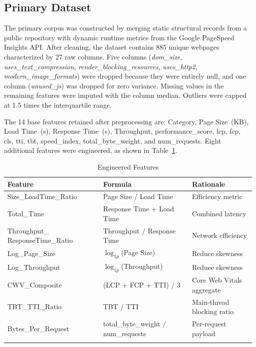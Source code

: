 \documentclass[sn-nature]{sn-jnl}
\begin{document}
\subsection{Primary Dataset}

The primary corpus was constructed by merging static structural records from a public repository with dynamic runtime metrics from the Google PageSpeed Insights API. After cleaning, the dataset contains 885 unique webpages characterized by 27 raw columns. Five columns (\textit{dom\_size}, \textit{uses\_text\_compression}, \textit{render\_blocking\_resources}, \textit{uses\_http2}, \textit{modern\_image\_formats}) were dropped because they were entirely null, and one column (\textit{unused\_js}) was dropped for zero variance. Missing values in the remaining features were imputed with the column median. Outliers were capped at 1.5 times the interquartile range.

The 14 base features retained after preprocessing are: Category, Page Size~(KB), Load Time~(s), Response Time~(s), Throughput, performance\_score, lcp, fcp, cls, tti, tbt, speed\_index, total\_byte\_weight, and num\_requests. Eight additional features were engineered, as shown in Table~\ref{tab:engineered_features}.

\begin{table}[htbp]
\caption{Engineered Features}\label{tab:engineered_features}
\centering
\begin{tabular}{p{} p{} p{}}
\toprule
Feature & Formula & Rationale \\
\midrule
Size\_LoadTime\_Ratio & Page Size / Load Time & Efficiency metric \\
Total\_Time & Response Time + Load Time & Combined latency \\
Throughput\_ \newline ResponseTime\_Ratio & Throughput / Response Time & Network efficiency \\
Log\_Page\_Size & $\log_{1p}$(Page Size) & Reduce skewness \\
Log\_Throughput & $\log_{1p}$(Throughput) & Reduce skewness \\
CWV\_Composite & (LCP + FCP + TTI) / 3 & Core Web Vitals aggregate \\
TBT\_TTI\_Ratio & TBT / TTI & Main-thread blocking ratio \\
Bytes\_Per\_Request & total\_byte\_weight / num\_requests & Per-request payload \\
\botrule
\end{tabular}
\end{table}
\end{document}
